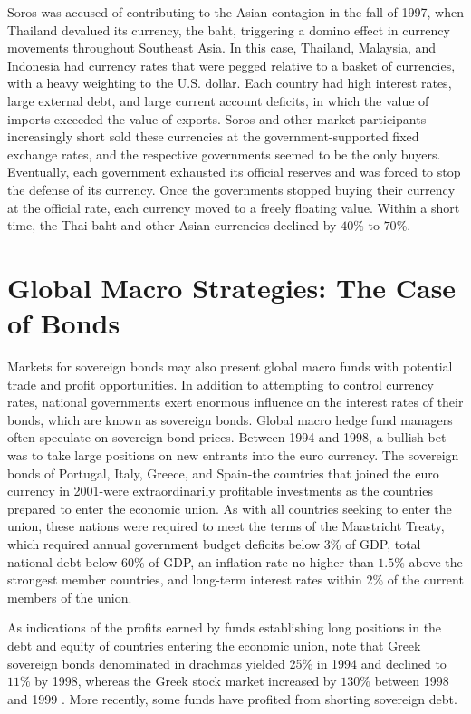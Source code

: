 \documentclass[11pt]{article}
\begin{document}
Soros was accused of contributing to the Asian contagion in the fall of 1997, when Thailand devalued its currency, the baht, triggering a domino effect in currency movements throughout Southeast Asia. In this case, Thailand, Malaysia, and Indonesia had currency rates that were pegged relative to a basket of currencies, with a heavy weighting to the U.S. dollar. Each country had high interest rates, large external debt, and large current account deficits, in which the value of imports exceeded the value of exports. Soros and other market participants increasingly short sold these currencies at the government-supported fixed exchange rates, and the respective governments seemed to be the only buyers. Eventually, each government exhausted its official reserves and was forced to stop the defense of its currency. Once the governments stopped buying their currency at the official rate, each currency moved to a freely floating value. Within a short time, the Thai baht and other Asian currencies declined by $40 \%$ to $70 \%$.

\section*{Global Macro Strategies: The Case of Bonds}
Markets for sovereign bonds may also present global macro funds with potential trade and profit opportunities. In addition to attempting to control currency rates, national governments exert enormous influence on the interest rates of their bonds, which are known as sovereign bonds. Global macro hedge fund managers often speculate on sovereign bond prices. Between 1994 and 1998, a bullish bet was to take large positions on new entrants into the euro currency. The sovereign bonds of Portugal, Italy, Greece, and Spain-the countries that joined the euro currency in 2001-were extraordinarily profitable investments as the countries prepared to enter the economic union. As with all countries seeking to enter the union, these nations were required to meet the terms of the Maastricht Treaty, which required annual government budget deficits below $3 \%$ of GDP, total national debt below $60 \%$ of GDP, an inflation rate no higher than $1.5 \%$ above the strongest member countries, and long-term interest rates within $2 \%$ of the current members of the union.

As indications of the profits earned by funds establishing long positions in the debt and equity of countries entering the economic union, note that Greek sovereign bonds denominated in drachmas yielded 25\% in 1994 and declined to $11 \%$ by 1998, whereas the Greek stock market increased by $130 \%$ between 1998 and 1999 . More recently, some funds have profited from shorting sovereign debt.
\end{document}
